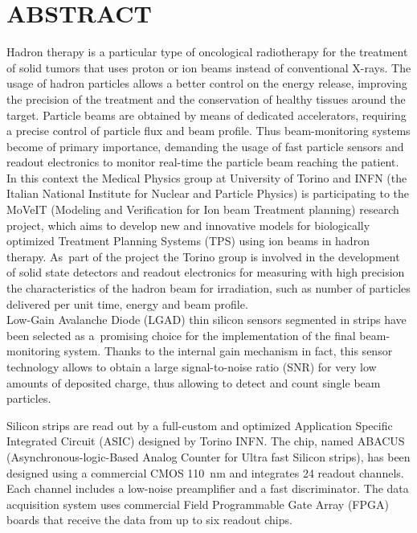 \chapter{ABSTRACT}

Hadron therapy is a particular type of oncological radiotherapy for the treatment of solid tumors that uses proton or
ion beams instead of conventional X-rays. The usage of hadron particles allows a better control on the energy release,
improving the precision of the treatment and the conservation of healthy tissues around the target.
Particle beams are obtained by means of dedicated accelerators, requiring a precise control of particle flux and beam profile.
Thus beam-monitoring systems become of primary importance, demanding the usage of fast particle sensors and readout electronics to monitor
real-time the particle beam reaching the patient.\\

In this context the Medical Physics group at University of Torino and INFN (the Italian National Institute for
Nuclear and Particle Physics) is participating to
the MoVeIT (Modeling and Verification for Ion beam Treatment planning) research project, which aims to develop new and
innovative models for biologically optimized Treatment Planning Systems (TPS) using ion beams in hadron therapy.
As~part of the project the Torino group is involved in the development of solid state detectors and readout electronics for measuring with high precision
the characteristics of the hadron beam for irradiation, such as number of particles delivered per unit time, energy and beam profile.\\

Low-Gain Avalanche Diode (LGAD) thin silicon sensors segmented in strips have been selected as a~promising choice for the implementation
of the final beam-monitoring system. Thanks to the internal gain mechanism in fact, this sensor technology allows to obtain a large
signal-to-noise ratio (SNR) for very low amounts of deposited charge, thus allowing to detect and count single beam particles.

\noindent Silicon strips are read out by a full-custom and optimized Application Specific Integrated Circuit (ASIC) designed by Torino INFN.
The chip, named ABACUS (Asynchronous-logic-Based Analog Counter for Ultra fast Silicon strips), has been 
designed using a commercial CMOS 110~nm and integrates 24 readout channels. Each channel includes a low-noise preamplifier 
and a fast discriminator. The data acquisition system uses commercial Field Programmable Gate Array (FPGA) boards that receive
the data from up to six readout chips.\\

